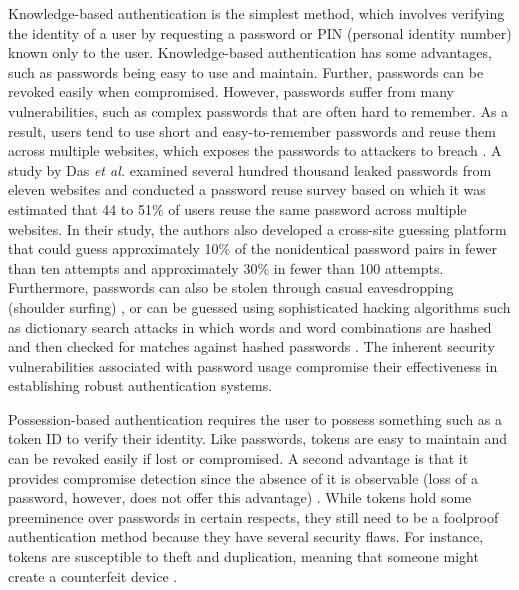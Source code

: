 Knowledge-based authentication is the simplest method, which involves verifying the identity of a user by requesting a password or PIN (personal identity number) known only to the user. Knowledge-based authentication has some advantages, such as passwords being easy to use and maintain. Further, passwords can be revoked easily when compromised. However, passwords suffer from many vulnerabilities, such as complex passwords that are often hard to remember. As a result, users tend to use short and easy-to-remember passwords and reuse them across multiple websites, which exposes the passwords to attackers to breach \cite{lashkari2009shoulder_surfing}. A study by Das \textit {et al.} \cite{das2014tangled} examined several hundred thousand leaked passwords from eleven websites and conducted a password reuse survey based on which it was estimated that 44 to 51\% of users reuse the same password across multiple websites. In their study, the authors also developed a cross-site guessing platform that could guess 
approximately 10$\%$ of the nonidentical password pairs in fewer than ten attempts and approximately 30$\%$ in fewer than 100 attempts. Furthermore, passwords can also be stolen through casual eavesdropping (shoulder surfing) \cite{lashkari2009shoulder_surfing}, or can be guessed using sophisticated hacking algorithms such as dictionary search attacks in which words and word combinations are hashed and then checked for matches against hashed passwords \cite{o2003comparing}. The inherent security vulnerabilities associated with password usage compromise their effectiveness in establishing robust authentication systems.
\smallskip

Possession-based authentication requires the user to possess something such as a token ID to verify their identity. Like passwords, tokens are easy to maintain and can be revoked easily if lost or compromised. A second advantage is that it provides compromise detection since the absence of it is observable (loss of a password, however, does not offer this advantage) \cite{o2003comparing}. While tokens hold some preeminence over passwords in certain respects, they still need to be a foolproof authentication method because they have several security flaws. For instance, tokens are susceptible to theft \cite{authentication_definition} and duplication, meaning that someone might create a counterfeit device \cite{o2003comparing}.  
\smallskip

